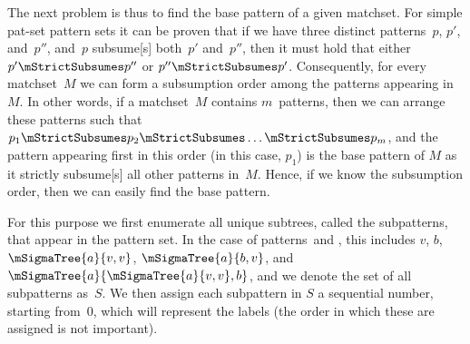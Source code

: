 {The next problem is thus to find the \gls{base pattern} of a given
\gls{matchset}.
%
For \gls{simple pat-set} \glspl{pattern set} it can be proven
that if we have three distinct \glspl{pattern}~$p$, $p'$, and~$p''$, and~$p$
\gls{subsume}[s] both~$p'$ and~$p''$, then it must hold that either \mbox{$p'
  \mStrictSubsumes p''$} or \mbox{$p'' \mStrictSubsumes p'$}.
%
Consequently, for
every \gls{matchset}~$M$ we can form a \gls{subsumption order} among the
\glspl{pattern} appearing in~$M$.
%
In other words, if a \gls{matchset}~$M$
contains $m$~\glspl{pattern}, then we can arrange these \glspl{pattern} such
that \mbox{$p_1 \mStrictSubsumes p_2 \mStrictSubsumes \ldots \mStrictSubsumes
  p_m$}, and the \gls{pattern} appearing first in this order (in this case,
$p_1$) is the \gls{base pattern} of $M$ as it \gls{strictly subsume}[s] all
other \glspl{pattern} in~$M$.
%
Hence, if we know the \gls{subsumption order},
then we can easily find the \gls{base pattern}.

For this purpose we first enumerate all unique \glspl{subtree}, called the
\glspl{subpattern}, that appear in the \gls{pattern set}.
%
In the case of
patterns~\tpatI and \tpatII, this includes $v$, $b$, \mbox{$\mSigmaTree{a}{v,
    v}$}, \mbox{$\mSigmaTree{a}{b, v}$}, and
\mbox{$\mSigmaTree{a}{\mSigmaTree{a}{v, v}, b}$}, and we denote the set of all
\glspl{subpattern} as~$S$.
%
We then assign each \gls{subpattern} in $S$ a
sequential number, starting from~0, which will represent the labels (the order
in which these are assigned is not important).

\def\mGS{\overline{G}_S}%
\def\mGImmS{G_S}%

}

